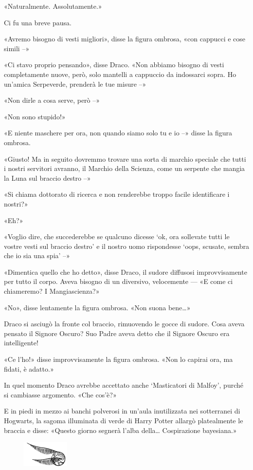 «Naturalmente. Assolutamente.»

Ci fu una breve pausa.

«Avremo bisogno di vesti migliori», disse la figura ombrosa, «con cappucci e cose simili –»

«Ci stavo proprio pensando», disse Draco. «Non abbiamo bisogno di vesti completamente nuove, però, solo mantelli a cappuccio da indossarci sopra. Ho un’amica Serpeverde, prenderà le tue misure –»

«Non dirle a cosa serve, però –»

«Non sono stupido!»

«E niente maschere per ora, non quando siamo solo tu e io –» disse la figura ombrosa.

«Giusto! Ma in seguito dovremmo trovare una sorta di marchio speciale che tutti i nostri servitori avranno, il Marchio della Scienza, come un serpente che mangia la Luna sul braccio destro –»

«Si chiama dottorato di ricerca e non renderebbe troppo facile identificare i nostri?»

«Eh?»

«Voglio dire, che succederebbe se qualcuno dicesse ‘ok, ora sollevate tutti le vostre vesti sul braccio destro’ e il nostro uomo rispondesse ‘oops, scusate, sembra che io sia una spia’ –»

«Dimentica quello che ho detto», disse Draco, il sudore diffusosi improvvisamente per tutto il corpo. Aveva bisogno di un diversivo, velocemente — «E come ci chiameremo? I Mangiascienza?»

«No», disse lentamente la figura ombrosa. «Non suona bene…»

Draco si asciugò la fronte col braccio, rimuovendo le gocce di sudore. Cosa aveva pensato il Signore Oscuro? Suo Padre aveva detto che il Signore Oscuro era intelligente!

«Ce l’ho!» disse improvvisamente la figura ombrosa. «Non lo capirai ora, ma fidati, è adatto.»

In quel momento Draco avrebbe accettato anche ‘Masticatori di Malfoy’, purché si cambiasse argomento. «Che cos’è?»

E in piedi in mezzo ai banchi polverosi in un’aula inutilizzata nei sotterranei di Hogwarts, la sagoma illuminata di verde di Harry Potter allargò platealmente le braccia e disse: «Questo giorno segnerà l’alba della… Cospirazione bayesiana.»

\begin{figure}[h!]
        \includegraphics[scale=0.4]{boccino.png}
        \centering
\end{figure}

